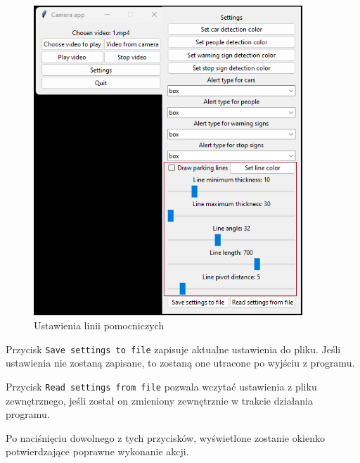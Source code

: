 \begin{figure}[H]
	\centering
	\includegraphics[width=0.9\textwidth]{Img/manual/line_settings.png}
	\caption{Ustawienia linii pomocniczych}
	\label{fig:line_settings}
\end{figure}

\newpage


Przycisk \verb|Save settings to file| zapisuje aktualne ustawienia do pliku. Jeśli ustawienia nie zostaną zapisane, to zostaną one utracone po wyjściu z programu.

Przycisk  \verb|Read settings from file| pozwala wczytać ustawienia z pliku zewnętrznego, jeśli został on zmieniony zewnętrznie w trakcie działania programu.

Po naciśnięciu dowolnego z tych przycisków, wyświetlone zostanie okienko potwierdzające poprawne wykonanie akcji.


